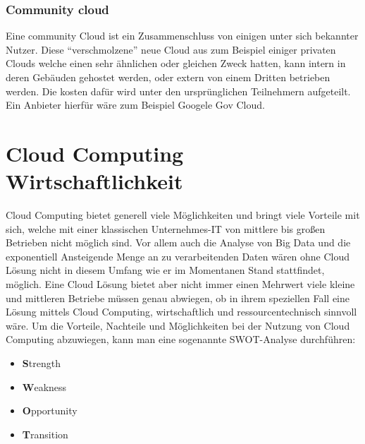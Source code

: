 \subsubsection{Community cloud}
Eine community Cloud ist ein Zusammenschluss von einigen unter sich bekannter Nutzer. Diese "`verschmolzene"' neue Cloud aus zum Beispiel einiger privaten Clouds welche einen sehr ähnlichen oder gleichen Zweck hatten, kann intern in deren Gebäuden gehostet werden, oder extern von einem Dritten betrieben werden. Die kosten dafür wird unter den ursprünglichen Teilnehmern aufgeteilt.
Ein Anbieter hierfür wäre zum Beispiel Googele Gov Cloud.

\section{Cloud Computing Wirtschaftlichkeit}
Cloud Computing bietet generell viele Möglichkeiten und bringt viele Vorteile mit sich, welche mit einer klassischen Unternehmes-IT von mittlere bis großen Betrieben nicht möglich sind. Vor allem auch die Analyse von Big Data und die exponentiell Ansteigende Menge an zu verarbeitenden Daten wären ohne Cloud Lösung nicht in diesem Umfang wie er im Momentanen Stand stattfindet, möglich.
Eine Cloud Lösung bietet aber nicht immer einen Mehrwert viele kleine und mittleren Betriebe müssen genau abwiegen, ob in ihrem speziellen Fall eine Lösung mittels Cloud Computing, wirtschaftlich und ressourcentechnisch sinnvoll wäre.
Um die Vorteile, Nachteile und Möglichkeiten bei der Nutzung von Cloud Computing abzuwiegen, kann man eine sogenannte SWOT-Analyse
durchführen:
\begin{itemize}
	\item \textbf{S}trength
	\item \textbf{W}eakness
	\item \textbf{O}pportunity
	\item \textbf{T}ransition
\end{itemize}

